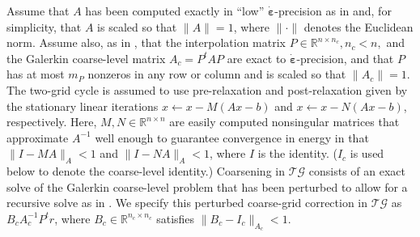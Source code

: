 \documentclass[onefignum,onetabnum]{siamart220329}
\newcommand{\ewed}{\boldsymbol{\dot{\varepsilon}}}
\renewcommand{\Re}{\mathbb{R}}
\newcommand{\tg}{$\mathcal{TG}$}
\begin{document}
Assume that $A$ has been computed exactly in  ``low'' $\ewed$-precision as in \cite{McCormick2021} and, for simplicity, that $A$ is scaled so that $\|A\| = 1$, where $\|\cdot\|$ denotes the Euclidean norm. Assume also, as in \cite{McCormick2021}, that the interpolation matrix $P \in \Re^{n \times n_c}, n_c < n,$ and the Galerkin coarse-level matrix $A_c = P^tAP$ are exact to $\ewed$-precision, and that $P$ has at most $m_P$ nonzeros in any row or column and is scaled so that $\|A_c\| = 1$. The two-grid cycle is assumed to use pre-relaxation and post-relaxation given by the stationary linear iterations $x \leftarrow x - M (Ax - b)$ and $x \leftarrow x - N (Ax - b)$, respectively. Here, $M, N \in \Re^{n \times n}$ are easily computed nonsingular matrices that approximate $A^{-1}$ well enough to guarantee convergence in energy in that $\|I - M A\|_A < 1$ and $\|I - N A\|_A < 1$,  where $I$ is the identity. ($I_c$ is used below to denote the coarse-level identity.) Coarsening in {\tg } consists of an exact  solve of the Galerkin coarse-level problem that has been perturbed to allow for a recursive solve as in \cite{McCormick2021}. We specify this perturbed coarse-grid correction in {\tg } as $B_c A_c^{-1} P^t r$, where $B_c \in \Re^{n_c \times n_c}$ satisfies $\|B_c - I_c\|_{A_c} < 1$. 
\end{document}
